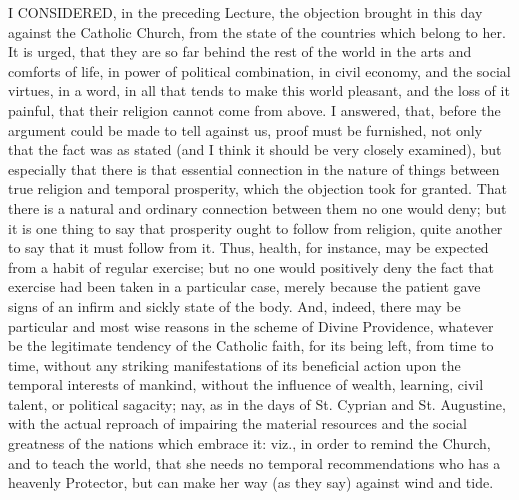 I CONSIDERED, in the preceding Lecture, the objection brought in
this day against the Catholic Church, from the state of the countries
which belong to her. It is urged, that they are so far behind the rest
of the world in the arts and comforts of life, in power of political
combination, in civil economy, and the social virtues, in a word, in
all that tends to make this world pleasant, and the loss of it
painful, that their religion cannot come from above. I answered, that,
before the argument could be made to tell against us, proof must be
furnished, not only that the fact was as stated (and I think it should
be very closely examined), but especially that there is that essential
connection in the nature of things between true religion and temporal
prosperity, which the objection took for granted. That there is a
natural and ordinary connection between them no one would deny; but it
is one thing to say that prosperity ought to follow from religion,
quite another to say that it must follow from it. Thus, health, for
instance, may be expected from a habit of regular exercise; but no one
would positively deny the fact that exercise had been taken in a
particular case, merely because the patient gave signs of an infirm
and sickly state of the body. And, indeed, there may be particular and
most wise reasons in the scheme of Divine Providence, whatever be the
legitimate tendency of the Catholic faith, for its being left, from
time to time, without any striking manifestations of its beneficial
action upon the temporal interests of mankind, without the influence
of wealth, learning, civil talent, or political sagacity; nay, as in
the days of St. Cyprian and St. Augustine, with the actual reproach of
impairing the material resources and the social greatness of the
nations which embrace it: viz., in order to remind the Church, and to
teach the world, that she needs no temporal recommendations who has a
heavenly Protector, but can make her way (as they say) against wind
and tide.

